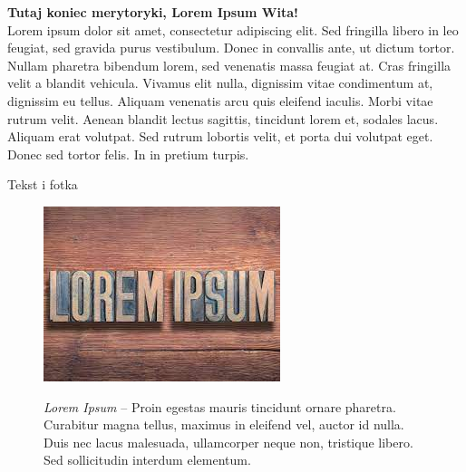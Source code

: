 \documentclass{beamer}
\begin{document}
\begin{frame}

\large{\textbf{Tutaj koniec merytoryki, Lorem Ipsum Wita!}}\\
Lorem ipsum dolor sit amet, consectetur adipiscing elit. Sed fringilla libero in leo feugiat, sed gravida purus vestibulum. Donec in 
convallis ante, ut dictum tortor. Nullam pharetra bibendum lorem, sed venenatis massa feugiat at. Cras fringilla velit a blandit 
vehicula. Vivamus elit nulla, dignissim vitae condimentum at, dignissim eu tellus. Aliquam venenatis arcu quis eleifend iaculis. Morbi 
vitae rutrum velit. Aenean blandit lectus sagittis, tincidunt lorem et, sodales lacus. Aliquam erat volutpat. Sed rutrum lobortis velit, 
et porta dui volutpat eget. Donec sed tortor felis. In in pretium turpis.

\end{frame}
\begin{frame}{Tekst i fotka}

\begin{figure}[htp]
\begin{minipage}{0.33\textwidth}
\centering
\includegraphics[width=\textwidth]{foto3.jpeg}
\end{minipage}
\begin{minipage}{0.66\textwidth}
\centering
\textit{Lorem Ipsum} – Proin egestas mauris tincidunt ornare pharetra. Curabitur magna tellus, maximus in eleifend vel, auctor id nulla. 
Duis nec lacus malesuada, ullamcorper neque non, tristique libero. Sed sollicitudin interdum elementum. 
\end{minipage}
\end{figure}
    
\end{frame}
\end{document}
